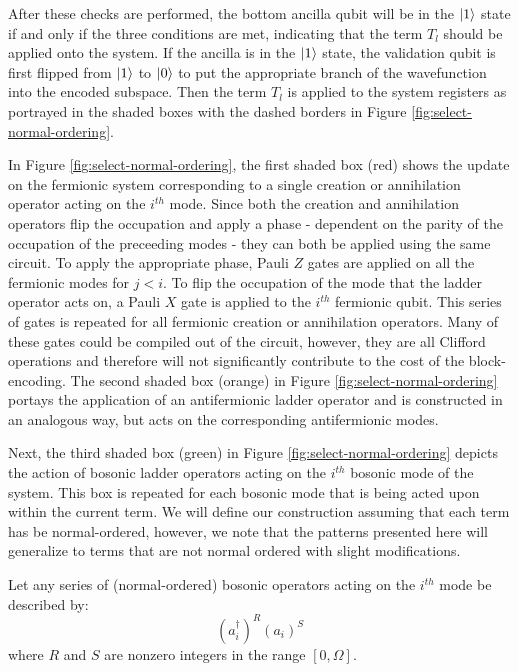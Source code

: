 After these checks are performed, the bottom ancilla qubit will be in the $\ket{1}$ state if and only if the three conditions are met, indicating that the term $T_l$ should be applied onto the system.
If the ancilla is in the $\ket{1}$ state, the validation qubit is first flipped from $\ket{1}$ to $\ket{0}$ to put the appropriate branch of the wavefunction into the encoded subspace.
Then the term $T_l$ is applied to the system registers as portrayed in the shaded boxes with the dashed borders in Figure \ref{fig:select-normal-ordering}.

In Figure \ref{fig:select-normal-ordering}, the first shaded box (red) shows the update on the fermionic system corresponding to a single creation or annihilation operator acting on the $i^{th}$ mode.
Since both the creation and annihilation operators flip the occupation and apply a phase - dependent on the parity of the occupation of the preceeding modes - they can both be applied using the same circuit.
To apply the appropriate phase, Pauli $Z$ gates are applied on all the fermionic modes for $j < i$.
To flip the occupation of the mode that the ladder operator acts on, a Pauli $X$ gate is applied to the $i^{th}$ fermionic qubit.
This series of gates is repeated for all fermionic creation or annihilation operators.
Many of these gates could be compiled out of the circuit, however, they are all Clifford operations and therefore will not significantly contribute to the cost of the block-encoding.
The second shaded box (orange) in Figure \ref{fig:select-normal-ordering} portays the application of an antifermionic ladder operator and is constructed in an analogous way, but acts on the corresponding antifermionic modes.

Next, the third shaded box (green) in Figure \ref{fig:select-normal-ordering} depicts the action of bosonic ladder operators acting on the $i^{th}$ bosonic mode of the system.
This box is repeated for each bosonic mode that is being acted upon within the current term.
We will define our construction assuming that each term has be normal-ordered, however, we note that the patterns presented here will generalize to terms that are not normal ordered with slight modifications.

Let any series of (normal-ordered) bosonic operators acting on the $i^{th}$ mode be described by:
\begin{equation}
    (a_i^\dagger)^R (a_i)^S
\end{equation}
where $R$ and $S$ are nonzero integers in the range $[0, \Omega]$.

